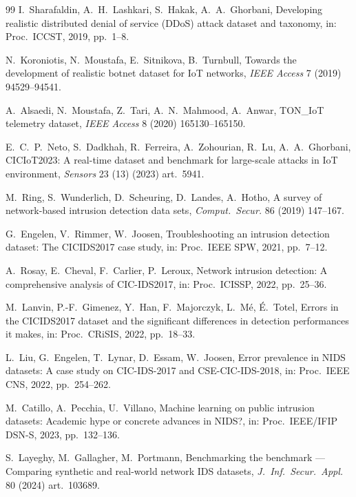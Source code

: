 \documentclass[preprint,12pt,authoryear]{elsarticle}
\begin{document}
\begin{thebibliography}{99}
I.~Sharafaldin, A.~H.~Lashkari, S.~Hakak, A.~A.~Ghorbani, Developing realistic
distributed denial of service (DDoS) attack dataset and taxonomy, in: Proc.\ ICCST,
2019, pp.~1--8.

N.~Koroniotis, N.~Moustafa, E.~Sitnikova, B.~Turnbull, Towards the development of
realistic botnet dataset for IoT networks, \textit{IEEE Access} 7 (2019)
94529--94541.

A.~Alsaedi, N.~Moustafa, Z.~Tari, A.~N.~Mahmood, A.~Anwar, TON\_IoT telemetry
dataset, \textit{IEEE Access} 8 (2020) 165130--165150.

E.~C.~P.~Neto, S.~Dadkhah, R.~Ferreira, A.~Zohourian, R.~Lu, A.~A.~Ghorbani,
CICIoT2023: A real-time dataset and benchmark for large-scale attacks in IoT
environment, \textit{Sensors} 23 (13) (2023) art.~5941.

M.~Ring, S.~Wunderlich, D.~Scheuring, D.~Landes, A.~Hotho, A survey of
network-based intrusion detection data sets, \textit{Comput.\ Secur.} 86 (2019)
147--167.

G.~Engelen, V.~Rimmer, W.~Joosen, Troubleshooting an intrusion detection dataset:
The CICIDS2017 case study, in: Proc.\ IEEE SPW, 2021, pp.~7--12.

A.~Rosay, E.~Cheval, F.~Carlier, P.~Leroux, Network intrusion detection: A
comprehensive analysis of CIC-IDS2017, in: Proc.\ ICISSP, 2022, pp.~25--36.

M.~Lanvin, P.-F.~Gimenez, Y.~Han, F.~Majorczyk, L.~M\'e, \'E.~Totel, Errors in the
CICIDS2017 dataset and the significant differences in detection performances it
makes, in: Proc.\ CRiSIS, 2022, pp.~18--33.

L.~Liu, G.~Engelen, T.~Lynar, D.~Essam, W.~Joosen, Error prevalence in NIDS
datasets: A case study on CIC-IDS-2017 and CSE-CIC-IDS-2018, in: Proc.\ IEEE CNS,
2022, pp.~254--262.

M.~Catillo, A.~Pecchia, U.~Villano, Machine learning on public intrusion datasets:
Academic hype or concrete advances in NIDS?, in: Proc.\ IEEE/IFIP DSN-S, 2023,
pp.~132--136.

S.~Layeghy, M.~Gallagher, M.~Portmann, Benchmarking the benchmark --- Comparing
synthetic and real-world network IDS datasets, \textit{J.\ Inf.\ Secur.\ Appl.} 80
(2024) art.~103689.


\end{thebibliography}
\end{document}

